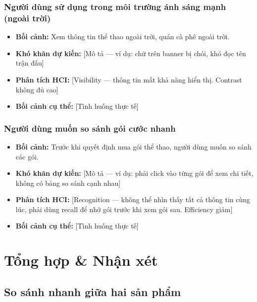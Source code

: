 \subsubsection{Người dùng sử dụng trong môi trường ánh sáng mạnh (ngoài trời)}
\begin{itemize}[leftmargin=2em]
  \item \textbf{Bối cảnh:} Xem thông tin thể thao ngoài trời, quán cà phê ngoài trời.
  \item \textbf{Khó khăn dự kiến:} [Mô tả --- ví dụ: chữ trên banner bị chói, khó đọc tên trận đấu]
  \item \textbf{Phân tích HCI:} [Visibility --- thông tin mất khả năng hiển thị. Contrast không đủ cao]
  \item \textbf{Bối cảnh cụ thể:} [Tình huống thực tế]
\end{itemize}

\subsubsection{Người dùng muốn so sánh gói cước nhanh}
\begin{itemize}[leftmargin=2em]
  \item \textbf{Bối cảnh:} Trước khi quyết định mua gói thể thao, người dùng muốn so sánh các gói.
  \item \textbf{Khó khăn dự kiến:} [Mô tả --- ví dụ: phải click vào từng gói để xem chi tiết, không có bảng so sánh cạnh nhau]
  \item \textbf{Phân tích HCI:} [Recognition --- không thể nhìn thấy tất cả thông tin cùng lúc, phải dùng recall để nhớ gói trước khi xem gói sau. Efficiency giảm]
  \item \textbf{Bối cảnh cụ thể:} [Tình huống thực tế]
\end{itemize}

\bigskip

\section{Tổng hợp \& Nhận xét}

\subsection{So sánh nhanh giữa hai sản phẩm}

